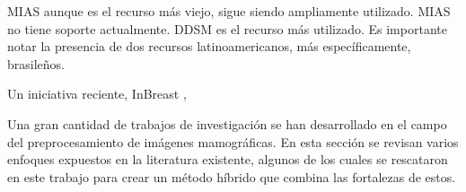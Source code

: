 MIAS \cite{sucklingmini} aunque es el recurso más viejo, sigue siendo
ampliamente utilizado. MIAS no tiene soporte actualmente. DDSM
\cite{heath2000digital} es el recurso más utilizado. Es importante notar la
presencia de dos recursos latinoamericanos, más específicamente, brasileños.


Un iniciativa reciente, InBreast \cite{inbreast}, 

Una gran cantidad de trabajos de investigación se han desarrollado en el
campo del preprocesamiento de imágenes mamográficas. En esta sección se revisan
varios enfoques expuestos en la literatura existente, algunos de los cuales se
rescataron en este trabajo para crear un método híbrido que combina las
fortalezas de estos. 

